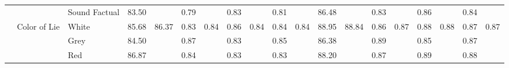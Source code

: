 \begin{table}[!tbh]
{\begin{tabular}{l|l|l|llllllll||llllllll}
                       &                                 & Sound Factual           & \multicolumn{1}{l|}{83.50} & \multicolumn{1}{l|}{}                       & \multicolumn{1}{l|}{0.79} & \multicolumn{1}{l|}{}                      & \multicolumn{1}{l|}{0.83} & \multicolumn{1}{l|}{}                      & \multicolumn{1}{l|}{0.81} &                       & \multicolumn{1}{l|}{86.48} & \multicolumn{1}{l|}{}                       & \multicolumn{1}{l|}{0.83} & \multicolumn{1}{l|}{}                      & \multicolumn{1}{l|}{0.86} & \multicolumn{1}{l|}{}                      & \multicolumn{1}{l|}{0.84} &                       \\ \cline{2-19} 
                       & \multirow{4}{*}{Color of Lie}   & White                   & \multicolumn{1}{l|}{85.68} & \multicolumn{1}{l|}{\multirow{4}{*}{86.37}} & \multicolumn{1}{l|}{0.83} & \multicolumn{1}{l|}{\multirow{4}{*}{0.84}} & \multicolumn{1}{l|}{0.86} & \multicolumn{1}{l|}{\multirow{4}{*}{0.84}} & \multicolumn{1}{l|}{0.84} & \multirow{4}{*}{0.84} & \multicolumn{1}{l|}{88.95} & \multicolumn{1}{l|}{\multirow{4}{*}{88.84}} & \multicolumn{1}{l|}{0.86} & \multicolumn{1}{l|}{\multirow{4}{*}{0.87}} & \multicolumn{1}{l|}{0.88} & \multicolumn{1}{l|}{\multirow{4}{*}{0.88}} & \multicolumn{1}{l|}{0.87} & \multirow{4}{*}{0.87} \\ \cline{3-4} \cline{6-6} \cline{8-8} \cline{10-10} \cline{12-12} \cline{14-14} \cline{16-16} \cline{18-18}
                       &                                 & Grey                    & \multicolumn{1}{l|}{84.50} & \multicolumn{1}{l|}{}                       & \multicolumn{1}{l|}{0.87} & \multicolumn{1}{l|}{}                      & \multicolumn{1}{l|}{0.83} & \multicolumn{1}{l|}{}                      & \multicolumn{1}{l|}{0.85} &                       & \multicolumn{1}{l|}{86.38} & \multicolumn{1}{l|}{}                       & \multicolumn{1}{l|}{0.89} & \multicolumn{1}{l|}{}                      & \multicolumn{1}{l|}{0.85} & \multicolumn{1}{l|}{}                      & \multicolumn{1}{l|}{0.87} &                       \\ \cline{3-4} \cline{6-6} \cline{8-8} \cline{10-10} \cline{12-12} \cline{14-14} \cline{16-16} \cline{18-18}
                       &                                 & Red                     & \multicolumn{1}{l|}{86.87} & \multicolumn{1}{l|}{}                       & \multicolumn{1}{l|}{0.84} & \multicolumn{1}{l|}{}                      & \multicolumn{1}{l|}{0.83} & \multicolumn{1}{l|}{}                      & \multicolumn{1}{l|}{0.83} &                       & \multicolumn{1}{l|}{88.20} & \multicolumn{1}{l|}{}                       & \multicolumn{1}{l|}{0.87} & \multicolumn{1}{l|}{}                      & \multicolumn{1}{l|}{0.89} & \multicolumn{1}{l|}{}                      & \multicolumn{1}{l|}{0.88} &                       \\ \cline{3-4} \cline{6-6} \cline{8-8} \cline{10-10} \cline{12-12} \cline{14-14} \cline{16-16} \cline{18-18}

\end{tabular}}
\end{table}
